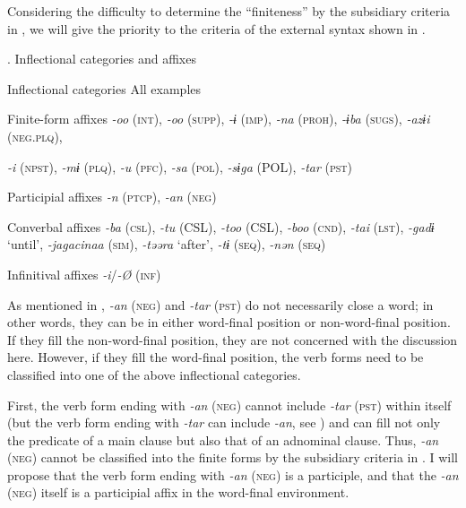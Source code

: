 Considering the difficulty to determine the “finiteness” by the subsidiary criteria in , we will give the priority to the criteria of the external syntax shown in .

\begin{table}
\caption{\label{tab:key:79}. Inflectional categories and affixes}

Inflectional categories  All examples

Finite-form affixes  \textit{{}-oo} (\textsc{int}), \textit{{}-oo} (\textsc{supp}), \textit{{}-ɨ} (\textsc{imp}), \textit{{}-na} (\textsc{proh}), \textit{{}-ɨba} (\textsc{sugs}), \textit{{}-azɨi} (\textsc{neg}.\textsc{plq}),

\textit{{}-i} (\textsc{npst}), \textit{{}-mɨ} (\textsc{plq}), \textit{{}-u} (\textsc{pfc}), \textit{{}-sa} (\textsc{pol}), \textit{{}-sɨga} (POL), \textit{{}-tar} (\textsc{pst})

Participial affixes  \textit{{}-n} (\textsc{ptcp}), \textit{{}-an} (\textsc{neg})

Converbal affixes  \textit{{}-ba} (\textsc{csl}), \textit{{}-tu} (CSL), \textit{{}-too} (CSL), \textit{{}-boo} (\textsc{cnd}), \textit{{}-tai} (\textsc{lst}), \textit{{}-gadɨ} ‘until’, \textit{{}-jagacinaa} (\textsc{sim}), \textit{{}-təəra} ‘after’, \textit{{}-tɨ} (\textsc{seq}), \textit{{}-nən} (\textsc{seq})

Infinitival affixes  \textit{{}-i}/\textit{{}-Ø} (\textsc{inf})
\end{table}

As mentioned in , \textit{{}-an} (\textsc{neg}) and \textit{{}-tar} (\textsc{pst}) do not necessarily close a word; in other words, they can be in either word-final position or non-word-final position. If they fill the non-word-final position, they are not concerned with the discussion here. However, if they fill the word-final position, the verb forms need to be classified into one of the above inflectional categories.

First, the verb form ending with \textit{{}-an} (\textsc{neg}) cannot include \textit{{}-tar} (\textsc{pst}) within itself (but the verb form ending with \textit{{}-tar} can include \textit{{}-an}, see ) and can fill not only the predicate of a main clause but also that of an adnominal clause. Thus, \textit{{}-an} (\textsc{neg}) cannot be classified into the finite forms by the subsidiary criteria in . I will propose that the verb form ending with \textit{-an} (\textsc{neg}) is a participle, and that the \textit{{}-an} (\textsc{neg}) itself is a participial affix in the word-final environment.

